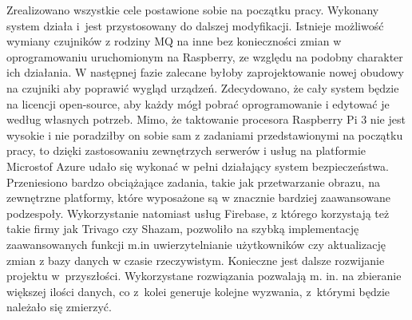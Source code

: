 \documentclass[polish,bachelor,a4paper,oneside]{ppfcmthesis}
\begin{document}
    Zrealizowano wszystkie cele postawione sobie na początku pracy. Wykonany system działa i~jest przystosowany do dalszej modyfikacji. Istnieje możliwość wymiany czujników z rodziny MQ na inne bez konieczności zmian w oprogramowaniu uruchomionym na Raspberry, ze względu na podobny charakter ich działania. W następnej fazie zalecane byłoby zaprojektowanie nowej obudowy na czujniki aby poprawić wygląd urządzeń. Zdecydowano, że cały system będzie na licencji open-source, aby każdy mógł pobrać oprogramowanie i edytować je według własnych potrzeb. Mimo, że taktowanie procesora Raspberry Pi 3 nie jest wysokie i nie poradziłby on sobie sam z zadaniami przedstawionymi na początku pracy, to dzięki zastosowaniu zewnętrzych serwerów i usług na platformie Microstof Azure udało się wykonać w pełni działający system bezpieczeństwa. Przeniesiono bardzo obciążające zadania, takie jak przetwarzanie obrazu, na zewnętrzne platformy, które wyposażone są w znacznie bardziej zaawansowane podzespoły. Wykorzystanie natomiast usług Firebase, z którego korzystają też takie firmy jak Trivago czy Shazam, pozwoliło na szybką implementację zaawansowanych funkcji m.in uwierzytelnianie użytkowników czy aktualizację zmian z bazy danych w czasie rzeczywistym.
    Konieczne jest dalsze rozwijanie projektu w~przyszłości. Wykorzystane rozwiązania pozwalają m. in. na zbieranie większej ilości danych, co z~kolei generuje kolejne wyzwania, z~którymi będzie należało się zmierzyć.



    \cleardoublepage
    \begingroup
    \makeatletter
    \let\ps@plain\ps@plain
    \makeatother

    \pagestyle{plain}

    
    
    \cleardoublepage
    \listoffigures
    \pagestyle{plain}
    \cleardoublepage
    \endgroup

    \ppcolophon
\end{document}

